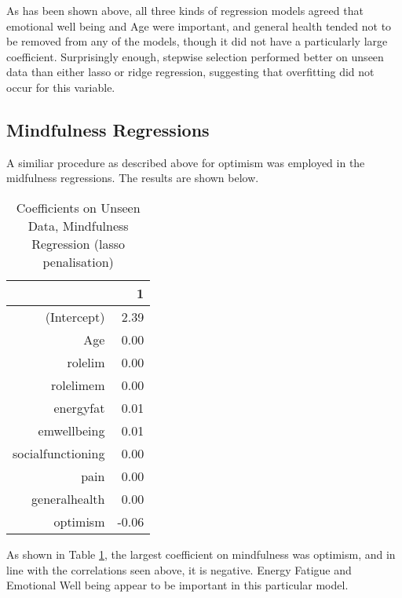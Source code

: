 \documentclass{article}
\begin{document}





As has been shown above, all three kinds of regression models agreed that emotional well being and Age were important, and general health tended not to be removed from any of the models, though it did not have a particularly large coefficient. Surprisingly enough, stepwise selection performed better on unseen data than either lasso or ridge regression, suggesting that overfitting did not occur for this variable. 




\subsection{Mindfulness Regressions}

A similiar procedure as described above for optimism was employed
in the midfulness regressions.  The results are shown below.




\begin{table}[ht]
\centering
\begin{tabular}{rr}
  \hline
 & 1 \\ 
  \hline
(Intercept) & 2.39 \\ 
  Age & 0.00 \\ 
  rolelim & 0.00 \\ 
  rolelimem & 0.00 \\ 
  energyfat & 0.01 \\ 
  emwellbeing & 0.01 \\ 
  socialfunctioning & 0.00 \\ 
  pain & 0.00 \\ 
  generalhealth & 0.00 \\ 
  optimism & -0.06 \\ 
   \hline
\end{tabular}
\caption{Coefficients on Unseen Data, Mindfulness Regression (lasso penalisation)} 
\label{tab:hom1mindlasso}
\end{table}
As shown in Table \ref{tab:hom1mindlasso}, the largest coefficient on mindfulness was optimism, and in line with the correlations seen above, it is negative. Energy Fatigue and Emotional Well being appear to be important in this particular model. 
\end{document}
